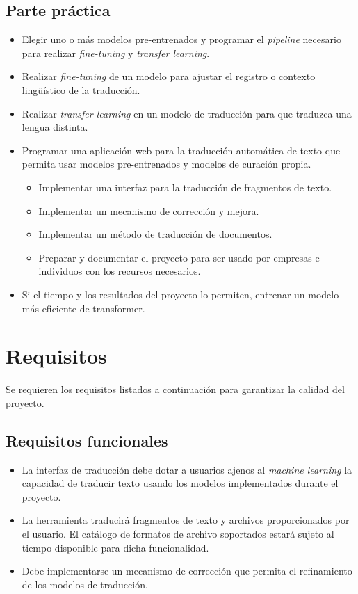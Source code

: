 \subsection*{Parte práctica}
    \begin{itemize}
        \item Elegir uno o más modelos pre-entrenados y programar el \textit{pipeline} necesario para
        realizar \textit{fine-tuning} y \textit{transfer learning}.
        \item Realizar \textit{fine-tuning} de un modelo para ajustar el registro o contexto
        lingüístico de la traducción.
        \item Realizar \textit{transfer learning} en un modelo de traducción para que traduzca
        una lengua distinta.
        \item Programar una aplicación web para la traducción automática de texto que permita
        usar modelos pre-entrenados y modelos de curación propia.
            \begin{itemize}
                \item Implementar una interfaz para la traducción de fragmentos de texto.
                \item Implementar un mecanismo de corrección y mejora.
                \item Implementar un método de traducción de documentos.
                \item Preparar y documentar el proyecto para ser usado por empresas e individuos con
                    los recursos necesarios.
            \end{itemize}
        \item Si el tiempo y los resultados del proyecto lo permiten, entrenar un modelo más eficiente
            de transformer.
    \end{itemize}



\section{Requisitos}
Se requieren los requisitos listados a continuación para garantizar la calidad del proyecto.

\subsection{Requisitos funcionales}
\begin{itemize}
    \item La interfaz de traducción debe dotar a usuarios ajenos al \textit{machine learning} la capacidad
    de traducir texto usando los modelos implementados durante el proyecto.
    \item La herramienta traducirá fragmentos de texto y archivos proporcionados por el usuario. 
    El catálogo de formatos de archivo soportados estará sujeto al tiempo disponible para
    dicha funcionalidad.
    \item Debe implementarse un mecanismo de corrección que permita el refinamiento de los modelos
    de traducción.
\end{itemize}

